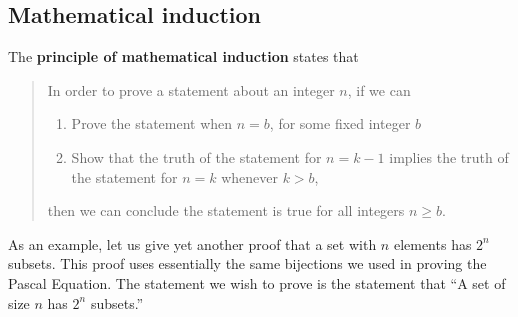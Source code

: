 \documentclass[10pt,]{book}
\newcommand{\terminology}[1]{\textbf{#1}}
\theoremstyle{plain}
\theoremstyle{definition}
\theoremstyle{definition}
\numberwithin{equation}{chapter}
\begin{document}
\subsection[{Mathematical induction}]{Mathematical induction}\label{subsection-11}
The \terminology{principle of mathematical induction} states that%
\begin{quote}\hypertarget{blockquote-6}{}
In order to prove a statement about an integer \(n\), if we can \leavevmode%
\begin{enumerate}
\item\hypertarget{li-5}{}Prove the statement when \(n=b\), for some fixed integer \(b\)%
\item\hypertarget{li-6}{}Show that the truth of the statement for \(n=k-1\) implies the truth of the statement for \(n=k\) whenever \(k>b\),%
\end{enumerate}
 then we can conclude the statement is true for all integers \(n\ge
b\).%
\end{quote}
As an example, let us give yet another proof that a set with \(n\) elements has \(2^n\) subsets. This proof uses essentially the same bijections we used in proving the Pascal Equation. The statement we wish to prove is the statement that ``A set of size \(n\) has \(2^n\) subsets.''%
\end{document}
